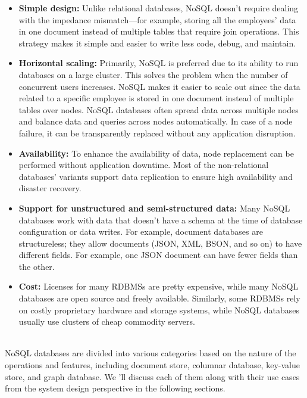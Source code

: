 \begin{itemize}
\item
\protect{}\label{euoOM-xGj0tcRbAKsxpkc}
\textbf{Simple design:} Unlike relational databases, NoSQL doesn't require dealing with the impedance mismatch---for example, storing all the employees' data in one document instead of multiple tables that require join operations. This strategy makes it simple and easier to write less code, debug, and maintain.
\item
\protect{}\label{LfAhYWYZ0ST-0ZrOvaSTM}
\textbf{Horizontal scaling:} Primarily, NoSQL is preferred due to its ability to run databases on a large cluster. This solves the problem when the number of concurrent users increases. NoSQL makes it easier to scale out since the data related to a specific employee is stored in one document instead of multiple tables over nodes. NoSQL databases often spread data across multiple nodes and balance data and queries across nodes automatically. In case of a node failure, it can be transparently replaced without any application disruption.
\item
\protect{}\label{Cgi7e6baNpp01i-HdcVAF}
\textbf{Availability:} To enhance the availability of data, node replacement can be performed without application downtime. Most of the non-relational databases' variants support data replication to ensure high availability and disaster recovery.
\item
\protect{}\label{5qKVoWLop1GtavJirx0Dx}
\textbf{Support for unstructured and semi-structured data:} Many NoSQL databases work with data that doesn't have a schema at the time of database configuration or data writes. For example, document databases are structureless; they allow documents (JSON, XML, BSON, and so on) to have different fields. For example, one JSON document can have fewer fields than the other.
\item
\protect{}\label{MNdcY7dc_yzZ2P9SgmGnI}
\textbf{Cost:} Licenses for many RDBMSs are pretty expensive, while many NoSQL databases are open source and freely available. Similarly, some RDBMSs rely on costly proprietary hardware and storage systems, while NoSQL databases usually use clusters of cheap commodity servers.
\end{itemize}
\\
NoSQL databases are divided into various categories based on the nature of the operations and features, including document store, columnar database, key-value store, and graph database. We 'll discuss each of them along with their use cases from the system design perspective in the following sections.

